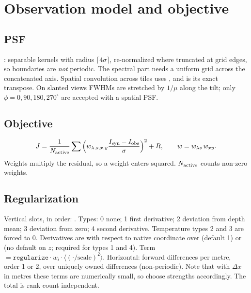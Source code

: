 \section{Observation model and objective}

\subsection{PSF}
: separable kernels with radius $\lceil4\sigma\rceil$, re-normalized where truncated at grid edges, so boundaries are \emph{not} periodic. The spectral part needs a uniform grid across the concatenated axis. Spatial convolution across tiles uses , and  is its exact transpose. On slanted views FWHMs are stretched by $1/\mu$ along the tilt; only $\phi=0,90,180,270^\circ$ are accepted with a spatial PSF.

\subsection{Objective}
\begin{equation}
J=\frac{1}{N_{\rm active}}\sum\Big(w_{\lambda,s,x,y}\frac{I_{\rm syn}-I_{\rm obs}}{\sigma}\Big)^2+R,\qquad w=w_{\lambda s}\,w_{xy}.
\end{equation}
Weights multiply the residual, so a weight enters squared. $N_{\rm active}$ counts non-zero weights.

\subsection{Regularization}
Vertical slots, in order: . Types: 0 none; 1 first derivative; 2 deviation from depth mean; 3 deviation from zero; 4 second derivative. Temperature types 2 and 3 are forced to 0. Derivatives are with respect to native coordinate over  (default 1) or  (no default on $z$; required for types 1 and 4). Term $=\texttt{regularize}\cdot w_i\cdot\langle(\cdot/\text{scale})^2\rangle$. Horizontal: forward differences per metre, order 1 or 2, over uniquely owned differences (non-periodic). Note that with $\Delta x$ in metres these terms are numerically small, so choose strengths accordingly. The total is rank-count independent.


